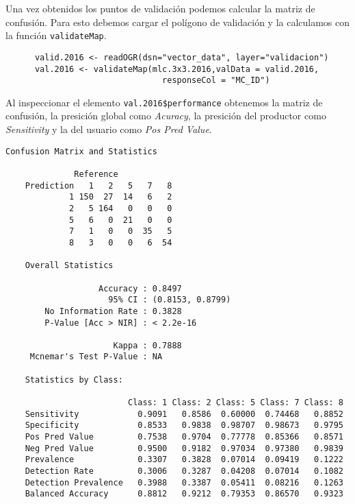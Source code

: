 \begin{exa}

  Una vez obtenidos los puntos de validaci\'on podemos calcular la matriz de confusi\'on.  Para esto debemos cargar el pol\'igono de validaci\'on y la calculamos con la funci\'on \texttt{validateMap}.

  \begin{lstlisting}
      valid.2016 <- readOGR(dsn="vector_data", layer="validacion")
      val.2016 <- validateMap(mlc.3x3.2016,valData = valid.2016,
                                responseCol = "MC_ID")
  \end{lstlisting}

  Al inspeccionar el elemento \verb|val.2016$performance| obtenemos la matriz
  de confusi\'on, la presici\'on global como \emph{Acuracy}, la presici\'on del
  productor como \emph{Sensitivity} y la del usuario como \emph{Pos Pred Value}.

  \begin{Verbatim}[fontsize=\small]
    Confusion Matrix and Statistics

              Reference
    Prediction   1   2   5   7   8
             1 150  27  14   6   2
             2   5 164   0   0   0
             5   6   0  21   0   0
             7   1   0   0  35   5
             8   3   0   0   6  54

    Overall Statistics

                   Accuracy : 0.8497
                     95% CI : (0.8153, 0.8799)
        No Information Rate : 0.3828
        P-Value [Acc > NIR] : < 2.2e-16

                      Kappa : 0.7888
     Mcnemar's Test P-Value : NA

    Statistics by Class:

                         Class: 1 Class: 2 Class: 5 Class: 7 Class: 8
    Sensitivity            0.9091   0.8586  0.60000  0.74468   0.8852
    Specificity            0.8533   0.9838  0.98707  0.98673   0.9795
    Pos Pred Value         0.7538   0.9704  0.77778  0.85366   0.8571
    Neg Pred Value         0.9500   0.9182  0.97034  0.97380   0.9839
    Prevalence             0.3307   0.3828  0.07014  0.09419   0.1222
    Detection Rate         0.3006   0.3287  0.04208  0.07014   0.1082
    Detection Prevalence   0.3988   0.3387  0.05411  0.08216   0.1263
    Balanced Accuracy      0.8812   0.9212  0.79353  0.86570   0.9323
  \end{Verbatim}


\end{exa}
